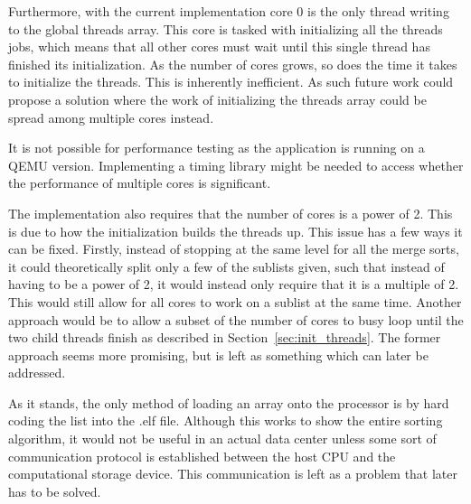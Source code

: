 Furthermore, with the current implementation core 0 is the only thread writing
to the global threads array. This core is tasked with initializing all the
threads jobs, which means that all other cores must wait until this single
thread has finished its initialization. As the number of cores grows, so does
the time it takes to initialize the threads. This is inherently inefficient. As
such future work could propose a solution where the work of initializing the
threads array could be spread among multiple cores instead.

It is not possible for performance testing as the application is running on a
QEMU version. Implementing a timing library might be needed to access whether
the performance of multiple cores is significant.

The implementation also requires that the number of cores is a power of 2. This
is due to how the initialization builds the threads up. This issue has a few
ways it can be fixed. Firstly, instead of stopping at the same level for all the
merge sorts, it could theoretically split only a few of the sublists given,
such that instead of having to be a power of 2, it would instead only require
that it is a multiple of 2. This would still allow for all cores to work on a
sublist at the same time. Another approach would be to allow a subset of the
number of cores to busy loop until the two child threads finish as described in
Section~\ref{sec:init_threads}. The former approach seems more promising, but is
left as something which can later be addressed.

As it stands, the only method of loading an array onto the processor is by hard
coding the list into the .elf file. Although this works to show the entire
sorting algorithm, it would not be useful in an actual data center unless some
sort of communication protocol is established between the host CPU and the
computational storage device. This communication is left as a problem that later
has to be solved.

